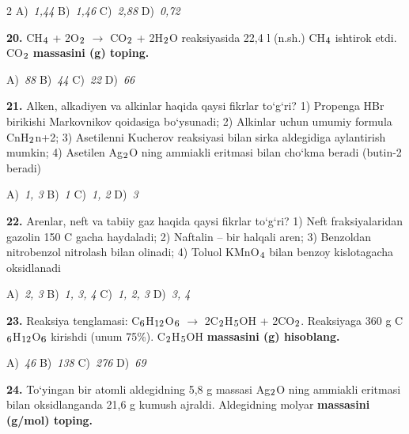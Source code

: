 \documentclass[11pt,a4paper]{article}
\renewcommand{\textsubscript}[1]{\ensuremath{_{\text{\fontsize{8}{8}\selectfont #1}}}}
\begin{document}
\begin{multicols}{2}
\noindent A)~\textsl{1,44} \hfill B)~\textsl{1,46} \hfill C)~\textsl{2,88} \hfill D)~\textsl{0,72}\par
\vspace{4pt}
\noindent\textbf{20.} CH\textsubscript{4} + 2O\textsubscript{2} $\to$ CO\textsubscript{2} + 2H\textsubscript{2}O reaksiyasida 22,4 l (n.sh.) CH\textsubscript{4} ishtirok etdi. CO\textsubscript{2} \textbf{massasini (g) toping.}

\noindent A)~\textsl{88} \hfill B)~\textsl{44} \hfill C)~\textsl{22} \hfill D)~\textsl{66}\par
\vspace{4pt}
\noindent\textbf{21.} Alken, alkadiyen va alkinlar haqida qaysi fikrlar to`g`ri? 1) Propenga HBr birikishi Markovnikov qoidasiga bo`ysunadi; 2) Alkinlar uchun umumiy formula CnH\textsubscript{2}n+2; 3) Asetilenni Kucherov reaksiyasi bilan sirka aldegidiga aylantirish mumkin; 4) Asetilen Ag\textsubscript{2}O ning ammiakli eritmasi bilan cho`kma beradi (butin-2 beradi)

\noindent A)~\textsl{1, 3} \hfill B)~\textsl{1} \hfill C)~\textsl{1, 2} \hfill D)~\textsl{3}\par
\vspace{4pt}
\noindent\textbf{22.} Arenlar, neft va tabiiy gaz haqida qaysi fikrlar to`g`ri? 1) Neft fraksiyalaridan gazolin 150 \textdegree{}C gacha haydaladi; 2) Naftalin -- bir halqali aren; 3) Benzoldan nitrobenzol nitrolash bilan olinadi; 4) Toluol KMnO\textsubscript{4} bilan benzoy kislotagacha oksidlanadi

\noindent A)~\textsl{2, 3} \hfill B)~\textsl{1, 3, 4} \hfill C)~\textsl{1, 2, 3} \hfill D)~\textsl{3, 4}\par
\vspace{4pt}
\noindent\textbf{23.} Reaksiya tenglamasi: C\textsubscript{6}H\textsubscript{12}O\textsubscript{6} $\to$ 2C\textsubscript{2}H\textsubscript{5}OH + 2CO\textsubscript{2}. Reaksiyaga 360 g C\textsubscript{6}H\textsubscript{12}O\textsubscript{6} kirishdi (unum 75\%). C\textsubscript{2}H\textsubscript{5}OH \textbf{massasini (g) hisoblang.}

\noindent A)~\textsl{46} \hfill B)~\textsl{138} \hfill C)~\textsl{276} \hfill D)~\textsl{69}\par
\vspace{4pt}
\noindent\textbf{24.} To`yingan bir atomli aldegidning 5,8 g massasi Ag\textsubscript{2}O ning ammiakli eritmasi bilan oksidlanganda 21,6 g kumush ajraldi. Aldegidning molyar \textbf{massasini (g/mol) toping.}


\end{multicols}
\end{document}
